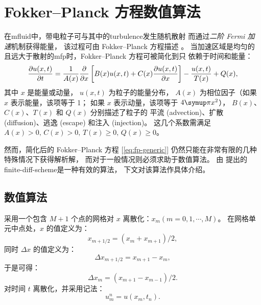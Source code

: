 
\chapter{Fokker--Planck 方程数值算法}
\label{app:fpsolver}

在\ac{mfluid}中，带电粒子可与其中的\ac{turbulence}发生随机散射
而通过\emph{二阶 Fermi 加速}机制获得能量\cite{fermi1949,fermi1954,davis1956}，
该过程可由 Fokker--Planck 方程描述
\cite{schlickeiser1989,eilek1991,schlickeiser2002}。
当加速区域是均匀的且远大于散射的\ac{mfp}时，Fokker--Planck 方程可被简化到只
依赖于时间和能量\cite{park1995,park1996}：
\begin{equation}
  \label{eq:fp-generic}
  \frac{\partial u(x,t)}{\partial t} = \frac{1}{A(x)} \frac{\partial }{\partial x}
    \left[ B(x) u(x,t) + C(x) \frac{\partial u(x,t)}{\partial x} \right]
    - \frac{u(x,t)}{T(x)} + Q(x) ,
\end{equation}
其中
$x$ 是能量或动量，
$u(x,t)$ 为粒子的能量分布，
$A(x)$ 为相位因子（如果 $x$ 表示能量，该项等于 1；
如果 $x$ 表示动量，该项等于 $4\Cpi x^2$），
$B(x)$、$C(x)$、$T(x)$ 和 $Q(x)$ 分别描述了粒子的
平流 (advection)、扩散 (diffusion)、逃逸 (escape) 和注入 (injection)。
这几个系数需满足 $A(x) > 0,\, C(x) > 0,\, T(x) \ge 0,\, Q(x) \ge 0$。

然而，简化后的 Fokker--Planck 方程 [\autoref{eq:fp-generic}]
仍然只能在非常有限的几种特殊情况下获得解析解，
而对于一般情况则必须求助于数值算法。
由  提出的\ac{finite-diff-scheme}是一种有效的算法，
下文对该算法作具体介绍。


\section{数值算法}

采用一个包含 $M+1$ 个点的网格对 $x$ 离散化：$x_m (m = 0, 1, \cdots, M)$。
在网格单元中点处，$x$ 的值定义为：
\begin{equation}
  \label{eq:x-mid}
  x_{m+1/2} = (x_m + x_{m+1}) \big/ 2 ,
\end{equation}
同时 $\Delta x$ 的值定义为：
\begin{equation}
  \label{eq:dx-mid}
  \Delta x_{m+1/2} = x_{m+1} - x_m ,
\end{equation}
于是可得：
\begin{equation}
  \label{eq:dx}
  \Delta x_m = (x_{m+1} - x_{m-1}) \big/ 2 .
\end{equation}
对时间 $t$ 离散化，并采用记法：
\begin{equation}
  \label{eq:u-t}
  u_m^n = u(x_m, t_n) .
\end{equation}

